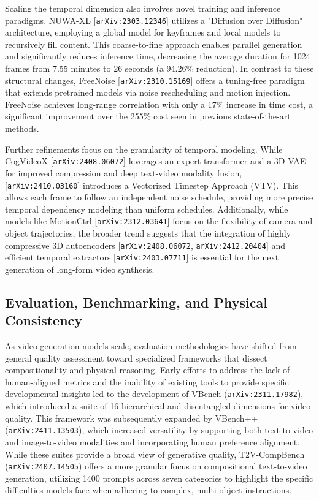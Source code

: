\documentclass[11pt]{article}
\begin{document}
Scaling the temporal dimension also involves novel training and inference paradigms. NUWA-XL [\texttt{arXiv:2303.12346}] utilizes a "Diffusion over Diffusion" architecture, employing a global model for keyframes and local models to recursively fill content. This coarse-to-fine approach enables parallel generation and significantly reduces inference time, decreasing the average duration for 1024 frames from 7.55 minutes to 26 seconds (a 94.26\% reduction). In contrast to these structural changes, FreeNoise [\texttt{arXiv:2310.15169}] offers a tuning-free paradigm that extends pretrained models via noise rescheduling and motion injection. FreeNoise achieves long-range correlation with only a 17\% increase in time cost, a significant improvement over the 255\% cost seen in previous state-of-the-art methods.

Further refinements focus on the granularity of temporal modeling. While CogVideoX [\texttt{arXiv:2408.06072}] leverages an expert transformer and a 3D VAE for improved compression and deep text-video modality fusion, [\texttt{arXiv:2410.03160}] introduces a Vectorized Timestep Approach (VTV). This allows each frame to follow an independent noise schedule, providing more precise temporal dependency modeling than uniform schedules. Additionally, while models like MotionCtrl [\texttt{arXiv:2312.03641}] focus on the flexibility of camera and object trajectories, the broader trend suggests that the integration of highly compressive 3D autoencoders [\texttt{arXiv:2408.06072}, \texttt{arXiv:2412.20404}] and efficient temporal extractors [\texttt{arXiv:2403.07711}] is essential for the next generation of long-form video synthesis.

\subsection{Evaluation, Benchmarking, and Physical Consistency}

As video generation models scale, evaluation methodologies have shifted from general quality assessment toward specialized frameworks that dissect compositionality and physical reasoning. Early efforts to address the lack of human-aligned metrics and the inability of existing tools to provide specific developmental insights led to the development of VBench (\texttt{arXiv:2311.17982}), which introduced a suite of 16 hierarchical and disentangled dimensions for video quality. This framework was subsequently expanded by VBench++ (\texttt{arXiv:2411.13503}), which increased versatility by supporting both text-to-video and image-to-video modalities and incorporating human preference alignment. While these suites provide a broad view of generative quality, T2V-CompBench (\texttt{arXiv:2407.14505}) offers a more granular focus on compositional text-to-video generation, utilizing 1400 prompts across seven categories to highlight the specific difficulties models face when adhering to complex, multi-object instructions.
\end{document}
